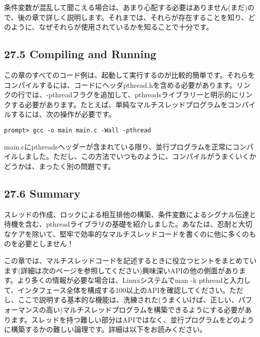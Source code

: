 条件変数が混乱して聞こえる場合は、あまり心配する必要はありません(まだ)ので、後の章で詳しく説明します。それまでは、それらが存在することを知り、どのように、なぜそれらが使用されているかを知ることで十分です。

\hypertarget{compiling-and-running}{%
\subsection*{27.5 Compiling and Running}\label{compiling-and-running}}

この章のすべてのコード例は、起動して実行するのが比較的簡単です。それらをコンパイルするには、コードにヘッダpthread.hを含める必要があります。リンクの行では、-pthreadフラグを追加して、pthreadsライブラリーと明示的にリンクする必要があります。たとえば、単純なマルチスレッドプログラムをコンパイルするには、次の操作が必要です。

\begin{verbatim}
prompt> gcc -o main main.c -Wall -pthread
\end{verbatim}

main.cにpthreadsヘッダーが含まれている限り、並行プログラムを正常にコンパイルしました。ただし、この方法でいつものように、コンパイルがうまくいくかどうかは、まったく別の問題です。

\hypertarget{summary-16}{%
\subsection*{27.6 Summary}\label{summary-16}}

スレッドの作成、ロックによる相互排他の構築、条件変数によるシグナル伝達と待機を含む、pthreadライブラリの基礎を紹介しました。あなたは、忍耐と大切なケアを除いて、堅牢で効率的なマルチスレッドコードを書くのに他に多くのものを必要としません！

この章では、マルチスレッドコードを記述するときに役立つヒントをまとめています(詳細は次のページを参照してください)興味深いAPIの他の側面があります。より多くの情報が必要な場合は、Linuxシステムでman
-k
pthreadと入力して、インタフェース全体を構成する100以上のAPIを確認してください。ただし、ここで説明する基本的な機能は、洗練された(うまくいけば、正しい、パフォーマンスの高い)マルチスレッドプログラムを構築できるようにする必要があります。スレッドを持つ難しい部分はAPIではなく、並行プログラムをどのように構築するかの難しい論理です。詳細は以下をお読みください。

